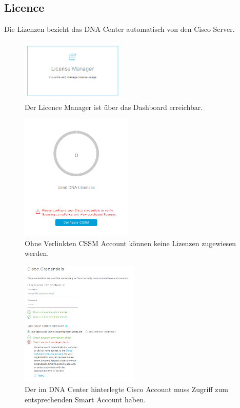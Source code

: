\subsection{Licence}
Die Lizenzen bezieht das DNA Center automatisch von den Cisco Server. 
\begin{figure}[H]
	\centering
	\includegraphics[height=3cm]{img/LicenceManager_001.png}
	\caption{Der Licence Manager ist über das Dashboard erreichbar.}
	\label{fig:dna-center-licence-1}
\end{figure}

\begin{figure}[H]
	\centering
	\includegraphics[height=6cm]{img/Selection_006.png}
	\caption{Ohne Verlinkten CSSM Account können keine Lizenzen zugewiesen werden.}
	\label{fig:dna-center-licence-3}
\end{figure}

\begin{figure}[H]
	\centering
	\includegraphics[height=6cm]{img/Selection_008.png}
	\caption{Der im DNA Center hinterlegte Cisco Account muss Zugriff zum entsprechenden Smart Account haben.}
	\label{fig:dna-center-licence-4}
\end{figure}

